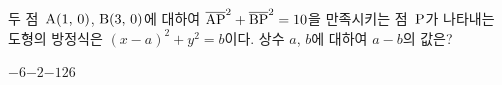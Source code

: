 두 점~$\mathrm{A}(1,\,0)$, $\mathrm{B}(3,\,0)$에 대하여 $\overline{\mathrm{AP}}^2+\overline{\mathrm{BP}}^2=10$을 만족시키는 점~$\mathrm{P}$가 나타내는 도형의 방정식은 $(x-a)^2+y^2=b$이다. 상수 $a$, $b$에 대하여 $a-b$의 값은?
\begin{choices32}{$-6$}{$-2$}{$-1$}{$2$}{$6$}\end{choices32}
